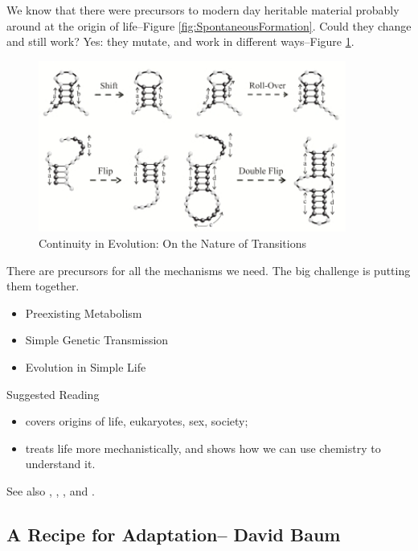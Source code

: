 \documentclass[]{article}
\begin{document}
We know that there were precursors to modern day heritable material probably around at the origin of life--Figure \ref{fig:SpontaneousFormation}\cite{cafferty2016spontaneous}. Could they change and still work? Yes: they mutate, and work in different ways--Figure \ref{fig:ContinuityInEvolution}\cite{fontana1998continuity}.

\begin{figure}[H]
	\caption{Continuity in Evolution: On the Nature of Transitions}\label{fig:ContinuityInEvolution}
	\includegraphics[width=0.9\textwidth]{ContinuityInEvolution}
\end{figure}
There are precursors for all the mechanisms we need. The big challenge is putting them together.
\begin{itemize}
	\item Preexisting Metabolism
	\item Simple Genetic Transmission
	\item Evolution in Simple Life
\end{itemize}

Suggested Reading
\begin{itemize}
	\item \cite{maynard1999origins} covers origins of life, eukaryotes, sex, society; 
	\item \cite{sumper1975evidence} treats life more mechanistically, and shows how we can use chemistry to understand it.
\end{itemize}

See also \cite{orgel2004prebiotic}, \cite{eigen1971selforganization}, \cite{kun2005real}, and \cite{ratcliff2014experimental}.

\subsection[A Recipe for Adaptation]{A Recipe for Adaptation-- David Baum}
\end{document}

